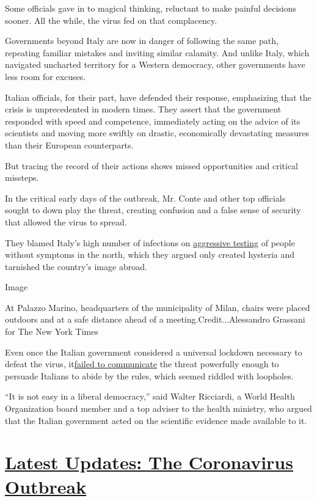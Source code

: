Some officials gave in to magical thinking, reluctant to make painful
decisions sooner. All the while, the virus fed on that complacency.

Governments beyond Italy are now in danger of following the same path,
repeating familiar mistakes and inviting similar calamity. And unlike
Italy, which navigated uncharted territory for a Western democracy,
other governments have less room for excuses.

Italian officials, for their part, have defended their response,
emphasizing that the crisis is unprecedented in modern times. They
assert that the government responded with speed and competence,
immediately acting on the advice of its scientists and moving more
swiftly on drastic, economically devastating measures than their
European counterparts.

But tracing the record of their actions shows missed opportunities and
critical missteps.

In the critical early days of the outbreak, Mr. Conte and other top
officials sought to down play the threat, creating confusion and a false
sense of security that allowed the virus to spread.

They blamed Italy's high number of infections on
\href{https://www.nytimes3xbfgragh.onion/2020/02/27/world/europe/italy-coronavirus.html?searchResultPosition=35}{aggressive
testing} of people without symptoms in the north, which they argued only
created hysteria and tarnished the country's image abroad.

Image

At Palazzo Marino, headquarters of the municipality of Milan, chairs
were placed outdoors and at a safe distance ahead of a
meeting.Credit...Alessandro Grassani for The New York Times

Even once the Italian government considered a universal lockdown
necessary to defeat the virus,
it\href{https://www.nytimes3xbfgragh.onion/2020/03/08/world/europe/italy-coronavirus-quarantine.html?searchResultPosition=26}{failed
to communicate} the threat powerfully enough to persuade Italians to
abide by the rules, which seemed riddled with loopholes.

``It is not easy in a liberal democracy,'' said Walter Ricciardi, a
World Health Organization board member and a top adviser to the health
ministry, who argued that the Italian government acted on the scientific
evidence made available to it.

\hypertarget{latest-updates-the-coronavirus-outbreak}{%
\section{\texorpdfstring{\href{https://www.nytimes3xbfgragh.onion/2020/08/21/world/covid-19-coronavirus.html?action=click\&pgtype=Article\&state=default\&region=MAIN_CONTENT_1\&context=storylines_live_updates}{Latest
Updates: The Coronavirus
Outbreak}}{Latest Updates: The Coronavirus Outbreak}}\label{latest-updates-the-coronavirus-outbreak}}

